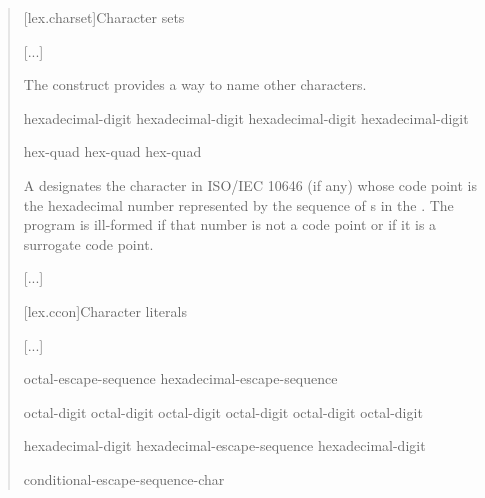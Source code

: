 \documentclass{wg21}
\begin{document}
\begin{quote}
    
    [lex.charset]{Character sets}
    
    [...]    
    
    \pnum
    The  construct provides a way to name
    other characters.
    
    \begin{bnf}
        \br
        hexadecimal-digit hexadecimal-digit hexadecimal-digit hexadecimal-digit
    \end{bnf}
    
    \begin{bnf}
        \br
         hex-quad\br
         hex-quad hex-quad\br
    \end{bnf}
    
    
    A 
    designates the character in ISO/IEC 10646 (if any)
    whose code point is the hexadecimal number represented by
    the sequence of s
    in the .
    The program is ill-formed if that number is not a code point
    or if it is a surrogate code point.
    
    [...]
    
    [lex.ccon]{Character literals}
    
    [...]
    
    \begin{bnf}
        \br
        octal-escape-sequence\br
        hexadecimal-escape-sequence
    \end{bnf}
    
    \begin{bnf}
        \br
        \terminal{\textbackslash} octal-digit\br
        \terminal{\textbackslash} octal-digit octal-digit\br
        \terminal{\textbackslash} octal-digit octal-digit octal-digit\br
    \end{bnf}
    
    \begin{bnf}
        \br
         hexadecimal-digit\br
        hexadecimal-escape-sequence hexadecimal-digit\br
    \end{bnf}
    
    \begin{bnf}
        \br
        \terminal{\textbackslash} conditional-escape-sequence-char
    \end{bnf}
    
\end{quote}
\end{document}
